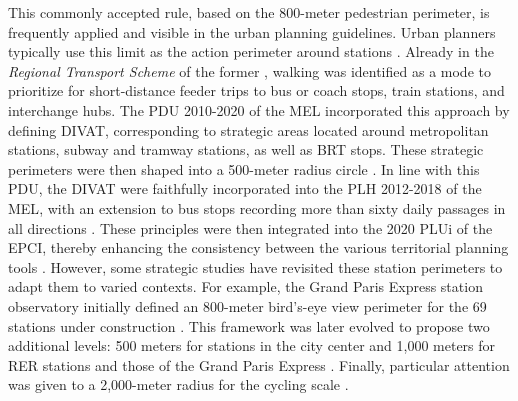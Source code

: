 \begin{refsegment}
This commonly accepted rule, based on the 800-meter pedestrian perimeter, is frequently applied and visible in the urban planning guidelines. Urban planners typically use this limit as the action perimeter around stations \textcolor{blue}{\autocite[40]{olszewski_using_2005}}. Already in the \textsl{Regional Transport Scheme} of the former \textcolor{blue}{\textcite[21]{region_nord-pas-de-calais_schema_2006}}, walking was identified as a mode to prioritize for short-distance feeder trips to bus or coach stops, train stations, and interchange hubs. The \acrfull{PDU} 2010-2020 of the \acrfull{MEL} incorporated this approach by defining \acrfull{DIVAT}, corresponding to strategic areas located around metropolitan stations, subway and tramway stations, as well as \acrfull{BRT} stops. These strategic perimeters were then shaped into a 500-meter radius circle \textcolor{blue}{\autocite[39]{lmcu_plan_2011}}. In line with this \acrshort{PDU}, the \acrshort{DIVAT} were faithfully incorporated into the \acrfull{PLH} 2012-2018 of the \acrshort{MEL}, with an extension to bus stops recording more than sixty daily passages in all directions \textcolor{blue}{\autocite[4]{lmcu_2e_2012}}. These principles were then integrated into the 2020 \acrfull{PLUi} of the \acrfull{EPCI}, thereby enhancing the consistency between the various territorial planning tools \textcolor{blue}{\autocite[44]{metropole_europeenne_de_lille_plan_2019-3}}. However, some strategic studies have revisited these station perimeters to adapt them to varied contexts. For example, the Grand Paris Express station observatory initially defined an 800-meter bird's-eye view perimeter for the 69 stations under construction \textcolor{blue}{\autocite[1]{apur_observatoire_2017}}. This framework was later evolved to propose two additional levels: 500 meters for stations in the city center and 1,000 meters for \acrfull{RER} stations and those of the Grand Paris Express \textcolor{blue}{\autocite[13]{apur_observatoire_2018}}. Finally, particular attention was given to a 2,000-meter radius for the cycling scale \textcolor{blue}{\autocite[22]{apur_observatoire_2018}}.%


\end{refsegment}

